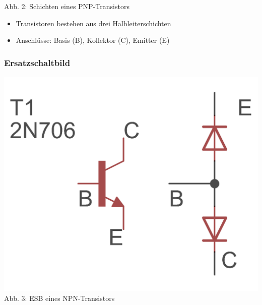 \begin{frame}
\begin{minipage}{0.4\textwidth}
	Abb. 2: Schichten eines PNP-Transistors
\end{minipage}
\vspace{0.5cm}
\begin{center}
\begin{itemize}
	\item Transistoren bestehen aus drei Halbleiterschichten
	\item Anschlüsse: Basis (B), Kollektor (C), Emitter (E)
\end{itemize}

\end{center}
\end{frame}

\begin{frame}
\frametitle{Ersatzschaltbild}

\begin{minipage}{0.4\textwidth}
	\includegraphics[scale=1.4]{e13/NPN_esb.png}\\
	Abb. 3: ESB eines NPN-Transistors
\end{minipage}
\hspace{0.5cm}
\begin{minipage}{0.4\textwidth}

\end{minipage}
\end{frame}
